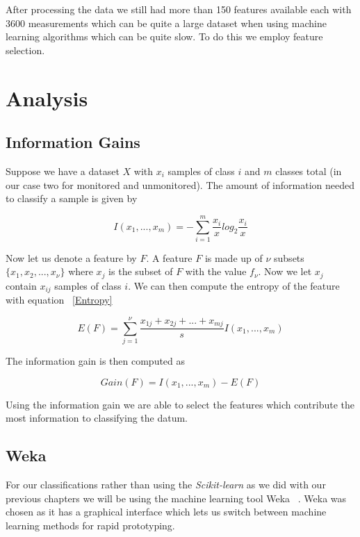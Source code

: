 After processing the data we still had more than 150 features available each with 3600 measurements which can be quite a large dataset when using machine learning algorithms which can be quite slow. To do this we employ feature selection.


\section{Analysis}
\subsection{Information Gains}
Suppose we have a dataset $X$ with $x_i$ samples of class $i$ and $m$ classes total (in our case two for monitored and unmonitored). The amount of information needed to classify a sample is given by 

\begin{equation}\label{InfoGain}
	I(x_1,...,x_m)=-\sum_{i=1}^{m}\frac{x_i}{x}log_2 \frac{x_i}{x}
\end{equation}

Now let us denote a feature by $F$. A feature $F$ is made up of $\nu$ subsets $\{x_1,x_2,...,x_\nu \}$ where $x_j$ is the subset of $F$ with the value $f_\nu$. Now we let $x_j$ contain $x_{ij}$ samples of class $i$. We can then compute the entropy of the feature with equation ~\ref{Entropy} 

\begin{equation}\label{Entropy}
	E(F) = \sum_{j=1}^{\nu} \frac{x_{1j}+x_{2j}+...+x_{mj}}{s}I(x_1,...,x_m)
\end{equation}

The information gain is then computed as 

\begin{equation}\label{Gain}
	Gain(F)=I(x_1,...,x_m)-E(F)
\end{equation}

Using the information gain we are able to select the features which contribute the most information to classifying the datum. 

\subsection{Weka}
For our classifications rather than using the \textit{Scikit-learn} as we did with our previous chapters we will be using the machine learning tool Weka ~\cite{hall2009weka}. Weka was chosen as it has a graphical interface which lets us switch between machine learning methods for rapid prototyping. 